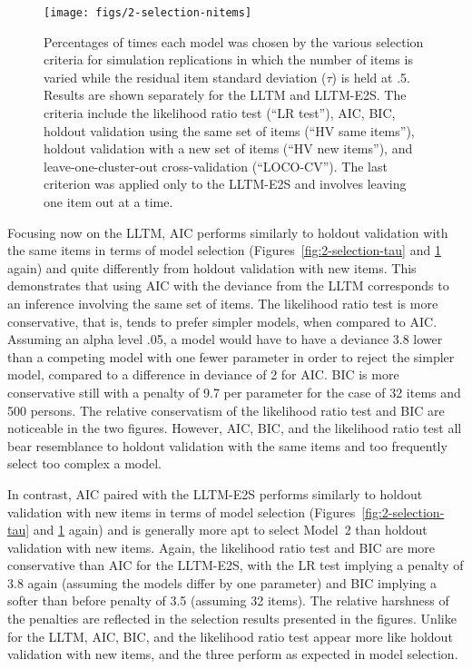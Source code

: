 \begin{figure}
	\centering
	\texttt{[image: figs/2-selection-nitems]}
	\caption{Percentages of times each model was chosen by the various selection criteria for simulation replications in which the number of items is varied while the residual item standard deviation ($\tau$) is held at .5. Results are shown separately for the LLTM and LLTM-E2S. The criteria include the likelihood ratio test (``LR test''), AIC, BIC, holdout validation using the same set of items (``HV same items''), holdout validation with a new set of items (``HV new items''), and leave-one-cluster-out cross-validation (``LOCO-CV''). The last criterion was applied only to the LLTM-E2S and involves leaving one item out at a time.}
	\label{fig:2-selection-nitems}
\end{figure}

Focusing now on the LLTM, AIC performs similarly to holdout validation with the same items in terms of model selection (Figures~\ref{fig:2-selection-tau} and \ref{fig:2-selection-nitems} again) and quite differently from holdout validation with new items. This demonstrates that using AIC with the deviance from the LLTM corresponds to an inference involving the same set of items. The likelihood ratio test is more conservative, that is, tends to prefer simpler models, when compared to AIC. Assuming an alpha level .05, a model would have to have a deviance 3.8 lower than a competing model with one fewer parameter in order to reject the simpler model, compared to a difference in deviance of 2 for AIC. BIC is more conservative still with a penalty of 9.7 per parameter for the case of 32 items and 500 persons. The relative conservatism of the likelihood ratio test and BIC are noticeable in the two figures. However, AIC, BIC, and the likelihood ratio test all bear resemblance to holdout validation with the same items and too frequently select too complex a model.

In contrast, AIC paired with the LLTM-E2S performs similarly to holdout validation with new items in terms of model selection (Figures~\ref{fig:2-selection-tau} and \ref{fig:2-selection-nitems} again) and is generally more apt to select Model~2 than holdout validation with new items. Again, the likelihood ratio test and BIC are more conservative than AIC for the LLTM-E2S, with the LR test implying a penalty of 3.8 again (assuming the models differ by one parameter) and BIC implying a softer than before penalty of 3.5 (assuming 32 items). The relative harshness of the penalties are reflected in the selection results presented in the figures. Unlike for the LLTM, AIC, BIC, and the likelihood ratio test appear more like holdout validation with new items, and the three perform as expected in model selection.

